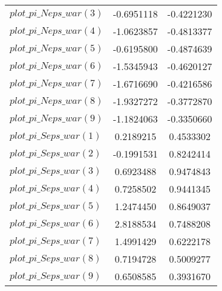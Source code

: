 \begin{center}
\begin{longtable}{lcc}
$plot\_pi\_N eps\_war (3)   $	 & 	     -0.6951118	 & 	     -0.4221230 \\ 
$plot\_pi\_N eps\_war (4)   $	 & 	     -1.0623857	 & 	     -0.4813377 \\ 
$plot\_pi\_N eps\_war (5)   $	 & 	     -0.6195800	 & 	     -0.4874639 \\ 
$plot\_pi\_N eps\_war (6)   $	 & 	     -1.5345943	 & 	     -0.4620127 \\ 
$plot\_pi\_N eps\_war (7)   $	 & 	     -1.6716690	 & 	     -0.4216586 \\ 
$plot\_pi\_N eps\_war (8)   $	 & 	     -1.9327272	 & 	     -0.3772870 \\ 
$plot\_pi\_N eps\_war (9)   $	 & 	     -1.1824063	 & 	     -0.3350660 \\ 
$plot\_pi\_S eps\_war (1)   $	 & 	      0.2189215	 & 	      0.4533302 \\ 
$plot\_pi\_S eps\_war (2)   $	 & 	     -0.1991531	 & 	      0.8242414 \\ 
$plot\_pi\_S eps\_war (3)   $	 & 	      0.6923488	 & 	      0.9474843 \\ 
$plot\_pi\_S eps\_war (4)   $	 & 	      0.7258502	 & 	      0.9441345 \\ 
$plot\_pi\_S eps\_war (5)   $	 & 	      1.2474450	 & 	      0.8649037 \\ 
$plot\_pi\_S eps\_war (6)   $	 & 	      2.8188534	 & 	      0.7488208 \\ 
$plot\_pi\_S eps\_war (7)   $	 & 	      1.4991429	 & 	      0.6222178 \\ 
$plot\_pi\_S eps\_war (8)   $	 & 	      0.7194728	 & 	      0.5009277 \\ 
$plot\_pi\_S eps\_war (9)   $	 & 	      0.6508585	 & 	      0.3931670 \\ 
\end{longtable}
 \end{center}
